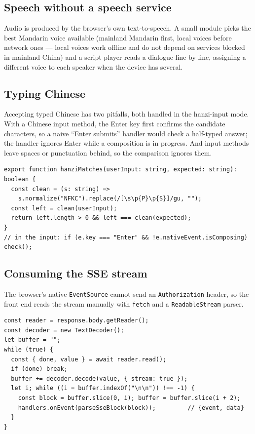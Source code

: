 \documentclass[11pt,a4paper]{article}
\begin{document}
\subsection{Speech without a speech service}

Audio is produced by the browser's own text-to-speech. A small module picks the
best Mandarin voice available (mainland Mandarin first, local voices before
network ones --- local voices work offline and do not depend on services
blocked in mainland China) and a script player reads a dialogue line by line,
assigning a different voice to each speaker when the device has several.

\subsection{Typing Chinese}

Accepting typed Chinese has two pitfalls, both handled in the hanzi-input mode.
With a Chinese input method, the Enter key first confirms the candidate
characters, so a naive ``Enter submits'' handler would check a half-typed
answer; the handler ignores Enter while a composition is in progress. And input
methods leave spaces or punctuation behind, so the comparison ignores them.

\begin{lstlisting}[language=TypeScriptX,caption={Comparing a typed word with
the expected characters.}]
export function hanziMatches(userInput: string, expected: string): boolean {
  const clean = (s: string) =>
    s.normalize("NFKC").replace(/[\s\p{P}\p{S}]/gu, "");
  const left = clean(userInput);
  return left.length > 0 && left === clean(expected);
}
// in the input: if (e.key === "Enter" && !e.nativeEvent.isComposing) check();
\end{lstlisting}

\subsection{Consuming the SSE stream}

The browser's native \texttt{EventSource} cannot send an
\texttt{Authorization} header, so the front end reads the stream manually with
\texttt{fetch} and a \texttt{ReadableStream} parser.

\begin{lstlisting}[language=TypeScriptX,caption={Custom SSE reader --- handles
auth headers, which native EventSource cannot.}]
const reader = response.body.getReader();
const decoder = new TextDecoder();
let buffer = "";
while (true) {
  const { done, value } = await reader.read();
  if (done) break;
  buffer += decoder.decode(value, { stream: true });
  let i; while ((i = buffer.indexOf("\n\n")) !== -1) {
    const block = buffer.slice(0, i); buffer = buffer.slice(i + 2);
    handlers.onEvent(parseSseBlock(block));         // {event, data}
  }
}
\end{lstlisting}
\end{document}
